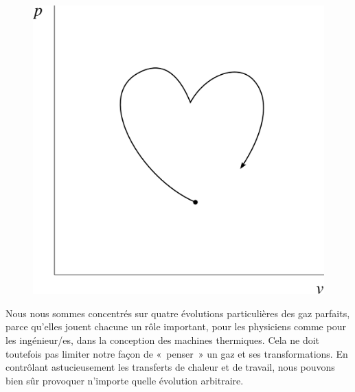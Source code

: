		\begin{figure}
			\begin{center}
				\includegraphics[width=\pvdiagramwidth]{images/pv_coeur.png}
			\end{center}
			\label{fig_gp_pv_coeur}
		\end{figure}
		
		Nous nous sommes concentrés sur quatre évolutions particulières des gaz parfaits, parce qu’elles jouent chacune un rôle important, pour les physiciens comme pour les ingénieur/es, dans la conception des machines thermiques. Cela ne doit toutefois pas limiter notre façon de «~penser~» un gaz et ses transformations. En contrôlant astucieusement les transferts de chaleur et de travail, nous pouvons bien sûr provoquer n’importe quelle évolution arbitraire.